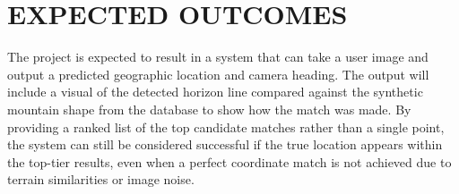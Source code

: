 \chapter{EXPECTED OUTCOMES}

The project is expected to result in a system that can take a user image and output a predicted geographic location and camera heading. The output will include a visual of the detected horizon line compared against the synthetic mountain shape from the database to show how the match was made. By providing a ranked list of the top candidate matches rather than a single point, the system can still be considered successful if the true location appears within the top-tier results, even when a perfect coordinate match is not achieved due to terrain similarities or image noise.
